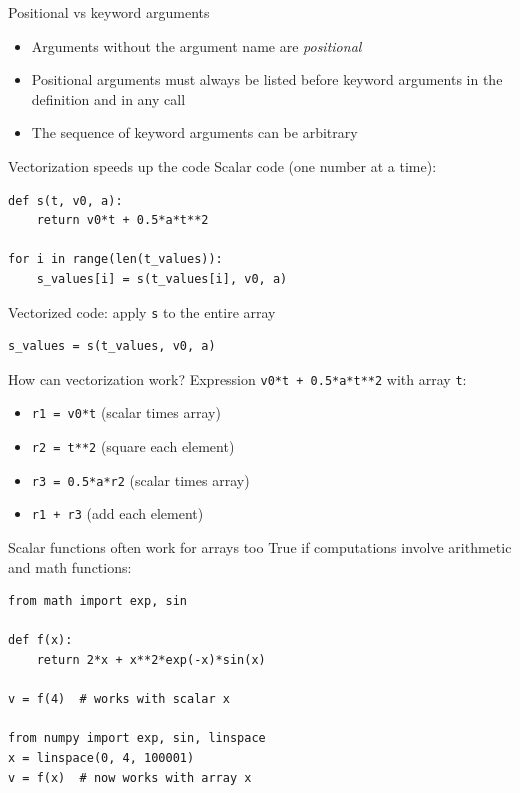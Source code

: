 \begin{frame}{Positional vs keyword arguments}
  \begin{itemize}
    \item Arguments without the argument name are \emph{positional}
    \item Positional arguments must always be listed before keyword
          arguments in the definition and in any call
    \item The sequence of keyword arguments can be arbitrary
  \end{itemize}
\end{frame}

\begin{frame}[fragile]{Vectorization speeds up the code}
  Scalar code (one number at a time):
\begin{lstlisting}[style=pythoncompact]
def s(t, v0, a):
    return v0*t + 0.5*a*t**2

for i in range(len(t_values)):
    s_values[i] = s(t_values[i], v0, a)
\end{lstlisting}
  Vectorized code: apply \texttt{s} to the entire array
\begin{lstlisting}[style=pythoncompact]
s_values = s(t_values, v0, a)
\end{lstlisting}
\end{frame}

\begin{frame}{How can vectorization work?}
  Expression \texttt{v0*t + 0.5*a*t**2} with array \texttt{t}:
  \begin{itemize}
    \item \texttt{r1 = v0*t} (scalar times array)
    \item \texttt{r2 = t**2} (square each element)
    \item \texttt{r3 = 0.5*a*r2} (scalar times array)
    \item \texttt{r1 + r3} (add each element)
  \end{itemize}
\end{frame}

\begin{frame}[fragile]{Scalar functions often work for arrays too}
  True if computations involve arithmetic and math functions:
\begin{lstlisting}[style=pythoncompact]
from math import exp, sin

def f(x):
    return 2*x + x**2*exp(-x)*sin(x)

v = f(4)  # works with scalar x

from numpy import exp, sin, linspace
x = linspace(0, 4, 100001)
v = f(x)  # now works with array x
\end{lstlisting}
\end{frame}

